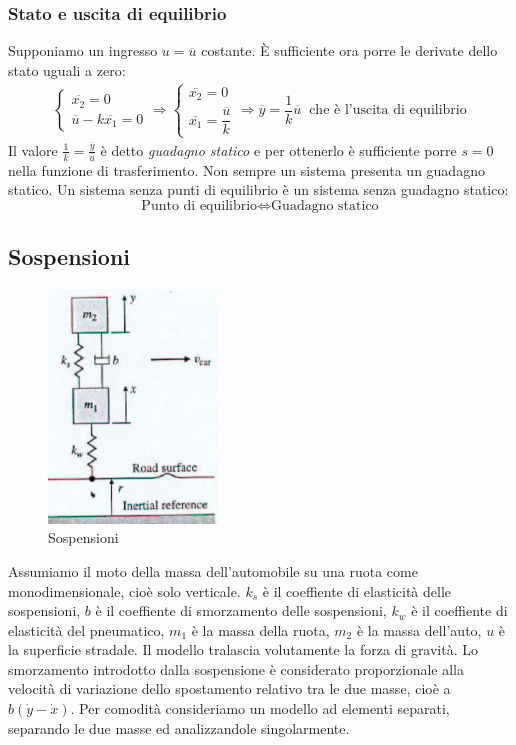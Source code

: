 \documentclass[a4paper]{report}
\begin{document}
\subsubsection{Stato e uscita di equilibrio}
Supponiamo un ingresso $u = \overline{u}$ costante. \`E sufficiente
ora porre le derivate dello stato uguali a zero:
\begin{eqnarray*}
  \left\{ \begin{array}{l}
    \overline{x_2} = 0\\
    \overline{u} - k \overline{x_1} = 0
    \end{array}\right .
  \Rightarrow
  \left\{ \begin{array}{l}
    \overline{x_2} = 0\\
    \overline{x_1} = \dfrac{\overline{u}}{k}
  \end{array}\right .
  \Rightarrow
  \overline{y} = \dfrac{1}{k} \overline{u} \;\; \textrm{che \`e l'uscita di equilibrio}
\end{eqnarray*}
Il valore $\frac{1}{k} = \frac{\overline{y}}{\overline{u}}$ \`e detto
{\em guadagno statico} e per ottenerlo \`e
sufficiente porre $s = 0$ nella funzione di trasferimento. Non sempre
un sistema presenta un guadagno statico. Un sistema senza punti di
equilibrio \`e un sistema senza guadagno statico:
$$\textrm{Punto di equilibrio} \Leftrightarrow \textrm{Guadagno statico}$$

\subsection{Sospensioni}
\begin{figure}[!b]
\centering
\includegraphics[width=0.4\textwidth]{./images/sospensioni.png}
\caption{Sospensioni\label{fig:sospensioni}}
\end{figure}
Assumiamo il moto della massa dell'automobile su una ruota come
monodimensionale, cio\`e solo verticale. $k_s$ \`e il coeffiente di
elasticit\`a delle sospensioni, $b$ \`e il coeffiente di smorzamento
delle sospensioni, $k_w$ \`e il coeffiente di elasticit\`a del
pneumatico, $m_1$ \`e la massa della ruota, $m_2$ \`e la massa
dell'auto, $u$ \`e la superficie stradale. Il modello tralascia
volutamente la forza di gravit\`a. Lo smorzamento introdotto dalla
sospensione \`e considerato proporzionale alla velocit\`a di
variazione dello spostamento relativo tra le due masse, cio\`e a
$b(\dot{y} - \dot{x})$. Per comodit\`a consideriamo un modello ad
elementi separati, separando le due masse ed analizzandole singolarmente.
\end{document}
